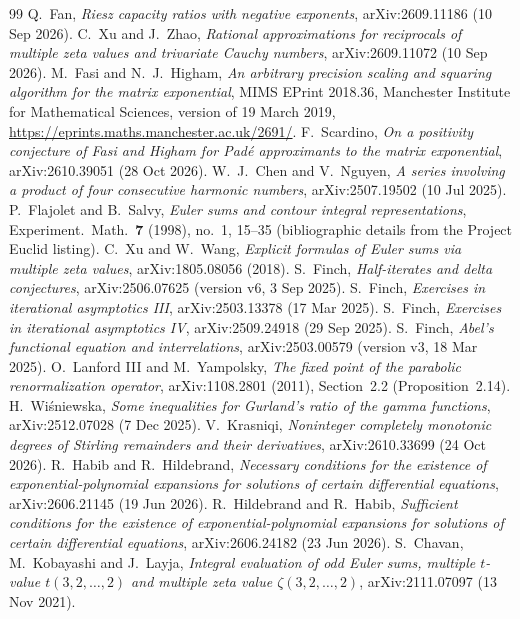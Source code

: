 \begin{thebibliography}{99}
 Q.~Fan, \emph{Riesz capacity ratios with negative exponents}, arXiv:2609.11186 (10 Sep 2026).
 C.~Xu and J.~Zhao, \emph{Rational approximations for reciprocals of multiple zeta values and trivariate Cauchy numbers}, arXiv:2609.11072 (10 Sep 2026).
 M.~Fasi and N.~J.~Higham, \emph{An arbitrary precision scaling and squaring algorithm for the matrix exponential}, MIMS EPrint 2018.36, Manchester Institute for Mathematical Sciences, version of 19 March 2019, \url{https://eprints.maths.manchester.ac.uk/2691/}.
 F.~Scardino, \emph{On a positivity conjecture of Fasi and Higham for Pad\'e approximants to the matrix exponential}, arXiv:2610.39051 (28 Oct 2026).
 W.~J.~Chen and V.~Nguyen, \emph{A series involving a product of four consecutive harmonic numbers}, arXiv:2507.19502 (10 Jul 2025).
 P.~Flajolet and B.~Salvy, \emph{Euler sums and contour integral representations}, Experiment.\ Math.\ \textbf{7} (1998), no.~1, 15--35 (bibliographic details from the Project Euclid listing).
 C.~Xu and W.~Wang, \emph{Explicit formulas of Euler sums via multiple zeta values}, arXiv:1805.08056 (2018).
 S.~Finch, \emph{Half-iterates and delta conjectures}, arXiv:2506.07625 (version v6, 3 Sep 2025).
 S.~Finch, \emph{Exercises in iterational asymptotics III}, arXiv:2503.13378 (17 Mar 2025).
 S.~Finch, \emph{Exercises in iterational asymptotics IV}, arXiv:2509.24918 (29 Sep 2025).
 S.~Finch, \emph{Abel's functional equation and interrelations}, arXiv:2503.00579 (version v3, 18 Mar 2025).
 O.~Lanford III and M.~Yampolsky, \emph{The fixed point of the parabolic renormalization operator}, arXiv:1108.2801 (2011), Section~2.2 (Proposition~2.14).
 H.~Wi\'sniewska, \emph{Some inequalities for Gurland's ratio of the gamma functions}, arXiv:2512.07028 (7 Dec 2025).
 V.~Krasniqi, \emph{Noninteger completely monotonic degrees of Stirling remainders and their derivatives}, arXiv:2610.33699 (24 Oct 2026).
 R.~Habib and R.~Hildebrand, \emph{Necessary conditions for the existence of exponential-polynomial expansions for solutions of certain differential equations}, arXiv:2606.21145 (19 Jun 2026).
 R.~Hildebrand and R.~Habib, \emph{Sufficient conditions for the existence of exponential-polynomial expansions for solutions of certain differential equations}, arXiv:2606.24182 (23 Jun 2026).
 S.~Chavan, M.~Kobayashi and J.~Layja, \emph{Integral evaluation of odd Euler sums, multiple $t$-value $t(3,2,\ldots,2)$ and multiple zeta value $\zeta(3,2,\ldots,2)$}, arXiv:2111.07097 (13 Nov 2021).

\end{thebibliography}
